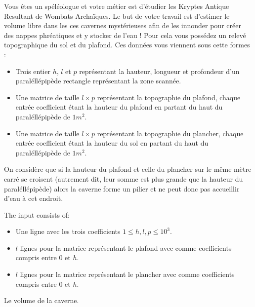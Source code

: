 

\newcommand{\maxa}{123456789}

Vous êtes un spéléologue et votre métier est d'étudier les Kryptes Antique Resultant de Wombats Archaïques. Le but de votre travail est d'estimer le volume libre dans les ces cavernes mystérieuses afin de les innonder pour créer des nappes phréatiques et y stocker de l'eau ! Pour cela vous possédez un relevé topographique du sol et du plafond. Ces données vous viennent sous cette formes :
\begin{itemize}
\item Trois entier $h$, $l$ et $p$ représentant la hauteur, longueur et profondeur d'un paraléllépipède rectangle représentant la zone scannée.
\item Une matrice de taille $l\times p$ représentant la topographie du plafond, chaque entrée coefficient étant la hauteur du plafond en partant du haut du paraléllépipède de $1m^2$.
\item Une matrice de taille $l\times p$ représentant la topographie du plancher, chaque entrée coefficient étant la hauteur du sol en partant du haut du paraléllépipède de $1m^2$.
\end{itemize}

On considère que si la hauteur du plafond et celle du plancher sur le même mètre carré se croisent (autrement dit, leur somme est plus grande que la hauteur du paraléllépipède) alors la caverne forme un pilier et ne peut donc pas accueillir d'eau à cet endroit.

\begin{Input}
    The input consists of:
    \begin{itemize}
        \item Une ligne avec les trois coefficients $1 \leq h, l, p \leq 10^3$.
        \item $l$ lignes pour la matrice représentant le plafond avec comme coefficients compris entre $0$ et $h$.
        \item $l$ lignes pour la matrice représentant le plancher avec comme coefficients compris entre $0$ et $h$.
    \end{itemize}
\end{Input}

\begin{Output}
    Le volume de la caverne.
\end{Output}

